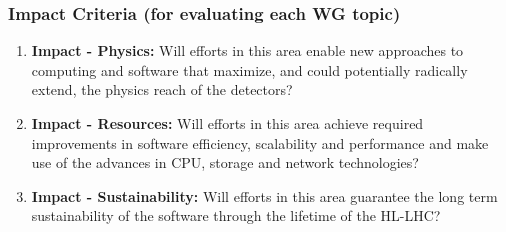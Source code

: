 \begin{frame}
\frametitle{Impact Criteria (for evaluating each WG topic)}

\begin{enumerate}
\item {\bf Impact - Physics:} Will efforts in this area enable new approaches to computing and software that maximize, and could potentially radically extend, the physics reach of the detectors?
\item {\bf Impact - Resources:} Will efforts in this area achieve required improvements in software efficiency, scalability and performance and make use of the advances in CPU, storage and network technologies?
\item {\bf Impact - Sustainability:} Will efforts in this area guarantee the long term sustainability of the software through the lifetime of the HL-LHC?
\end{enumerate}
\end{frame}


